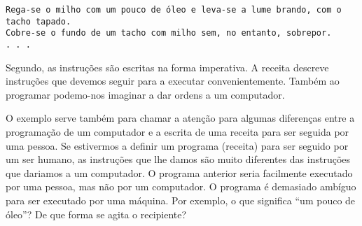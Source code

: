 \begin{lstlisting}
Rega-se o milho com um pouco de óleo e leva-se a lume brando, com o tacho tapado. 
Cobre-se o fundo de um tacho com milho sem, no entanto, sobrepor. 
. . . 
\end{lstlisting}


Segundo, as instruções são escritas na forma imperativa. A receita descreve instruções que devemos seguir para a executar convenientemente. Também ao programar podemo-nos imaginar a dar ordens a um computador.

O exemplo serve também para chamar a atenção para algumas diferenças entre a programação de um computador e a escrita de uma receita para ser seguida por uma pessoa. Se estivermos a definir um programa (receita) para ser seguido por um ser humano, as instruções que lhe damos são muito diferentes das
instruções que dariamos a um computador. O programa anterior seria facilmente executado por uma pessoa, mas não por um computador. O programa é demasiado ambíguo para ser executado por uma máquina. Por exemplo, o que significa ``um pouco de óleo''? De que forma se agita o recipiente?





%
%




